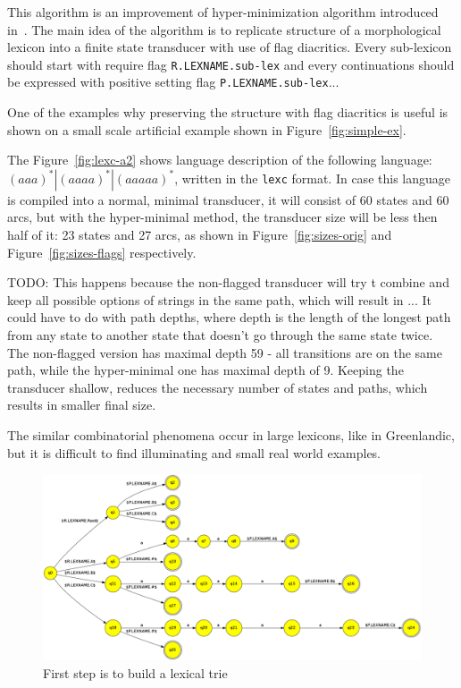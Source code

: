 \documentclass[11pt]{article}
\begin{document}
This algorithm is an improvement of hyper-minimization algorithm introduced in~. The main idea of the algorithm is to replicate structure of a morphological lexicon into a finite state transducer with use of flag diacritics. Every sub-lexicon should start with require flag \verb+R.LEXNAME.sub-lex+ and every continuations should be expressed with positive setting flag \verb+P.LEXNAME.sub-lex+...

One of the examples why preserving the structure with flag diacritics is useful is shown on a small scale artificial example shown in Figure~\ref{fig:simple-ex}.
 
The Figure~\ref{fig:lexc-a2} shows language description of the following language: $(aaa)^*|(aaaa)^*|(aaaaa)^*$, written in the \texttt{lexc} format. In case this language is compiled into a normal, minimal transducer, it will consist of 60 states and 60 arcs, 
but with the hyper-minimal method, the transducer size will be less then half of it: 23 states and 27 arcs, as shown in 
Figure~\ref{fig:sizes-orig} and Figure~\ref{fig:sizes-flags} respectively.

TODO: This happens because the non-flagged transducer will try t combine and keep all possible options of strings in the same path, which will result in ... It could have to do with path depths, where depth is the length of the longest path from any state to another state that doesn't go through the same state twice. The non-flagged version has maximal depth 59 - all transitions are on the same path, while the hyper-minimal one has maximal depth of 9. Keeping the transducer shallow, reduces the necessary number of states and paths, which results in smaller final size.

The similar combinatorial phenomena occur in large lexicons, like in Greenlandic, but it is difficult to find illuminating and small real world examples.





\begin{figure}
    \includegraphics[width=\textwidth]{trie.png}
     \caption{First step is to build a lexical trie
     \label{fig:trie}}
\end{figure}
\end{document}
